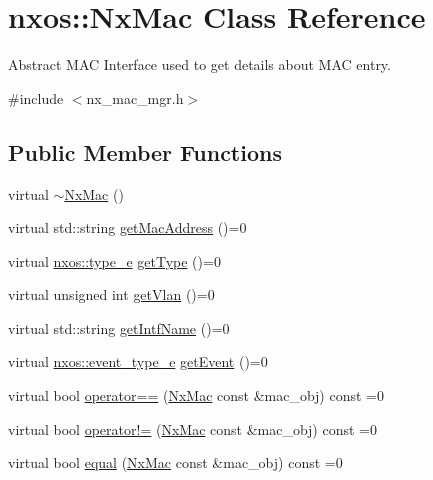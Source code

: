 \hypertarget{classnxos_1_1_nx_mac}{}\section{nxos\+:\+:Nx\+Mac Class Reference}
\label{classnxos_1_1_nx_mac}


Abstract M\+AC Interface used to get details about M\+AC entry.  




{\ttfamily \#include $<$nx\+\_\+mac\+\_\+mgr.\+h$>$}

\subsection*{Public Member Functions}
\begin{DoxyCompactItemize}
\item 
virtual \mbox{\hyperlink{classnxos_1_1_nx_mac_a54a2228786abb8df6429123aa39795cb}{$\sim$\+Nx\+Mac}} ()
\item 
virtual std\+::string \mbox{\hyperlink{classnxos_1_1_nx_mac_ae1510492e7d8fe257f918c74bbe6b0ea}{get\+Mac\+Address}} ()=0
\item 
virtual \mbox{\hyperlink{namespacenxos_acfd59f63fea0b34d70c39b7e808cb5d2}{nxos\+::type\+\_\+e}} \mbox{\hyperlink{classnxos_1_1_nx_mac_a4cf7307522c86006f61a7c106843762a}{get\+Type}} ()=0
\item 
virtual unsigned int \mbox{\hyperlink{classnxos_1_1_nx_mac_ab785cecf1661f3c30c96fe952ba410f3}{get\+Vlan}} ()=0
\item 
virtual std\+::string \mbox{\hyperlink{classnxos_1_1_nx_mac_a4d29913106ccffd03fbd93fed04129eb}{get\+Intf\+Name}} ()=0
\item 
virtual \mbox{\hyperlink{namespacenxos_af9a9040b7681199d386e94eb888018cb}{nxos\+::event\+\_\+type\+\_\+e}} \mbox{\hyperlink{classnxos_1_1_nx_mac_a78876af7dfe79a990ea9eacc6f6dd078}{get\+Event}} ()=0
\item 
virtual bool \mbox{\hyperlink{classnxos_1_1_nx_mac_ae6ebe78a6679fb460e2ed1f18c08acd0}{operator==}} (\mbox{\hyperlink{classnxos_1_1_nx_mac}{Nx\+Mac}} const \&mac\+\_\+obj) const =0
\item 
virtual bool \mbox{\hyperlink{classnxos_1_1_nx_mac_a11e241f495e5f2a00b6782b3f5416237}{operator!=}} (\mbox{\hyperlink{classnxos_1_1_nx_mac}{Nx\+Mac}} const \&mac\+\_\+obj) const =0
\item 
virtual bool \mbox{\hyperlink{classnxos_1_1_nx_mac_a9a4529b39d875b2dd54b0208d1a61c1a}{equal}} (\mbox{\hyperlink{classnxos_1_1_nx_mac}{Nx\+Mac}} const \&mac\+\_\+obj) const =0
\end{DoxyCompactItemize}



